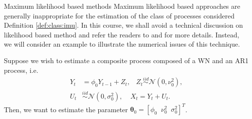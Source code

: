 \documentclass[envcountsect,usenames,dvipsnames]{beamer}
\def\btheta{\bm \theta}
\def\simiid{\stackrel{iid}{\sim}}
\theoremstyle{mystyle}
\begin{document}
\begin{frame}{Maximum likelihood based methods}
    Maximum likelihood based approaches are generally inappropriate for the estimation of the class of processes considered Definition \ref{def:class:imu}. In this course, we shall avoid a technical discussion on likelihood based method and refer the readers to \cite{stebler2011constrained} and \cite{guerrier2016discussion} for more details. Instead, we will consider an example to illustrate the numerical issues of this technique.
    
    \vspace{0.5cm}
    
    Suppose we wish to estimate a composite process composed of a WN and an AR1 process, i.e.
    \begin{equation}
       \begin{aligned}
            Y_t &= \phi_0 Y_{t-1} + Z_t, \;\;\; Z_t \simiid \mathcal{N}\left(0, \nu^2_0 \right), \\
        U_t &\simiid \mathcal{N}\left(0, \sigma^2_0 \right), \;\;\;\; X_t = Y_t + U_t.
       \end{aligned}
       \label{eq:example:mle:model}
    \end{equation}
    Then, we want to estimate the parameter $\btheta_0 = \left[\phi_0 \;\; \nu^2_0 \;\; \sigma^2_0\right]^T$.
\end{frame}
\end{document}
